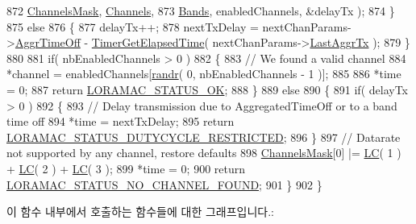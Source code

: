 \begin{DoxyCode}
872                                                       \mbox{\hyperlink{_region_c_n779_8c_a2188957b5ca6af8092154d7ccbfa5757}{ChannelsMask}}, 
      \mbox{\hyperlink{_region_c_n779_8c_ad43b16563c3a87159ec34d1db860a3da}{Channels}},
873                                                       \mbox{\hyperlink{_region_c_n779_8c_af0fa082231b29a5cac086386277e6ecc}{Bands}}, enabledChannels, &delayTx );
874     \}
875     \textcolor{keywordflow}{else}
876     \{
877         delayTx++;
878         nextTxDelay = nextChanParams->\mbox{\hyperlink{structs_next_chan_params_a3609676d2d3b7c00e25615324b35cb26}{AggrTimeOff}} - 
      \mbox{\hyperlink{time_server_8c_a9ca7e27f3d6474daff63f2e093a2e91e}{TimerGetElapsedTime}}( nextChanParams->\mbox{\hyperlink{structs_next_chan_params_a381b728f60b185ecf3313e974c18768b}{LastAggrTx}} );
879     \}
880 
881     \textcolor{keywordflow}{if}( nbEnabledChannels > 0 )
882     \{
883         \textcolor{comment}{// We found a valid channel}
884         *channel = enabledChannels[\mbox{\hyperlink{utilities_8c_af5d8ad6dae489ac64821e7d4f004595d}{randr}}( 0, nbEnabledChannels - 1 )];
885 
886         *time = 0;
887         \textcolor{keywordflow}{return} \mbox{\hyperlink{group___l_o_r_a_m_a_c_gga1d18f26b344040b3ec5c3db662919661a03db5fca052313edb3823c014b653a74}{LORAMAC\_STATUS\_OK}};
888     \}
889     \textcolor{keywordflow}{else}
890     \{
891         \textcolor{keywordflow}{if}( delayTx > 0 )
892         \{
893             \textcolor{comment}{// Delay transmission due to AggregatedTimeOff or to a band time off}
894             *time = nextTxDelay;
895             \textcolor{keywordflow}{return} \mbox{\hyperlink{group___l_o_r_a_m_a_c_gga1d18f26b344040b3ec5c3db662919661a0c982ada0769ecee2e1041fb6945ddd4}{LORAMAC\_STATUS\_DUTYCYCLE\_RESTRICTED}};
896         \}
897         \textcolor{comment}{// Datarate not supported by any channel, restore defaults}
898         \mbox{\hyperlink{_region_c_n779_8c_a2188957b5ca6af8092154d7ccbfa5757}{ChannelsMask}}[0] |= \mbox{\hyperlink{group___r_e_g_i_o_n_ga12fa17e5c1016e01a9d82c25027deb1b}{LC}}( 1 ) + \mbox{\hyperlink{group___r_e_g_i_o_n_ga12fa17e5c1016e01a9d82c25027deb1b}{LC}}( 2 ) + \mbox{\hyperlink{group___r_e_g_i_o_n_ga12fa17e5c1016e01a9d82c25027deb1b}{LC}}( 3 );
899         *time = 0;
900         \textcolor{keywordflow}{return} \mbox{\hyperlink{group___l_o_r_a_m_a_c_gga1d18f26b344040b3ec5c3db662919661a393266a9952cf6617917f1fce181efcd}{LORAMAC\_STATUS\_NO\_CHANNEL\_FOUND}};
901     \}
902 \}
\end{DoxyCode}
이 함수 내부에서 호출하는 함수들에 대한 그래프입니다.\+:
\mbox{\label{group___r_e_g_i_o_n_c_n779_ga89b2db72c7dd1dbaa07135d538e3c2fe}} 
